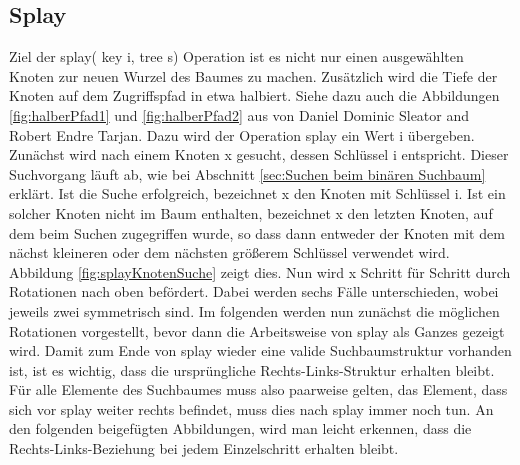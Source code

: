 \documentclass[11pt, a4paper]{article}
\begin{document}
	\subsection{Splay}
	Ziel der splay( key i, tree s) Operation ist es nicht nur einen ausgewählten Knoten zur neuen Wurzel des Baumes zu machen. Zusätzlich wird die Tiefe der Knoten auf dem Zugriffspfad in etwa halbiert. Siehe dazu auch die Abbildungen \ref{fig:halberPfad1} und \ref{fig:halberPfad2} aus \cite{sl2} von Daniel Dominic Sleator and Robert Endre Tarjan. Dazu wird der Operation splay ein Wert i übergeben. Zunächst wird nach einem Knoten x gesucht, dessen Schlüssel i entspricht. Dieser Suchvorgang läuft ab, wie bei Abschnitt \ref{sec:Suchen beim binären Suchbaum} erklärt. Ist die Suche erfolgreich, bezeichnet x den Knoten mit Schlüssel i. Ist ein solcher Knoten nicht im Baum enthalten, bezeichnet x den letzten Knoten, auf dem beim Suchen zugegriffen wurde, so dass dann entweder der Knoten mit dem nächst kleineren oder dem nächsten größerem Schlüssel verwendet wird. Abbildung \ref{fig:splayKnotenSuche} zeigt dies. Nun wird x Schritt für Schritt durch Rotationen nach oben befördert. Dabei werden sechs Fälle unterschieden, wobei jeweils zwei symmetrisch sind. Im folgenden werden nun zunächst die möglichen Rotationen vorgestellt, bevor dann die Arbeitsweise von splay als Ganzes gezeigt wird. Damit zum Ende von splay wieder eine valide Suchbaumstruktur vorhanden ist, ist es wichtig, dass die ursprüngliche Rechts-Links-Struktur erhalten bleibt. Für alle Elemente des Suchbaumes muss also paarweise gelten, das Element, dass sich vor splay weiter rechts befindet, muss dies nach splay immer noch tun. An den folgenden beigefügten Abbildungen, wird man leicht erkennen, dass die Rechts-Links-Beziehung bei jedem Einzelschritt erhalten bleibt.
	 
\end{document}
